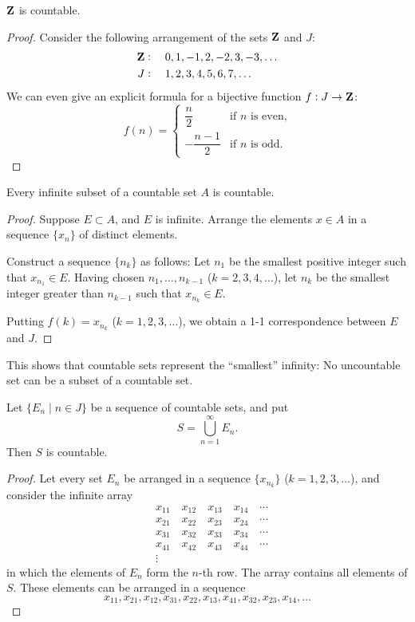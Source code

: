 \begin{proposition}
$\mathbf Z$ is countable.
\end{proposition}

\begin{proof}
Consider the following arrangement of the sets $\mathbf Z$ and $J$:
\begin{align*}
\mathbf Z&:\quad0,1,-1,2,-2,3,-3,\dots\\
J&:\quad1,2,3,4,5,6,7,\dots
\end{align*}
We can even give an explicit formula for a bijective function $f:J\to\mathbf Z$:
\[f(n)=\begin{cases}
\dfrac{n}{2}&\text{if }n\text{ is even,}\\[1ex]
-\dfrac{n-1}{2}&\text{if }n\text{ is odd.}
\end{cases}\]
\end{proof}

\begin{proposition}
Every infinite subset of a countable set $A$ is countable.
\end{proposition}

\begin{proof}
Suppose $E\subset A$, and $E$ is infinite. Arrange the elements $x\in A$ in a sequence $\{x_n\}$ of distinct elements.

Construct a sequence $\{n_k\}$ as follows: Let $n_1$ be the smallest positive integer such that $x_{n_1}\in E$. Having chosen $n_1,\dots,n_{k-1}$ ($k=2,3,4,\dots$), let $n_k$ be the smallest integer greater than $n_{k-1}$ such that $x_{n_k}\in E$.

Putting $f(k)=x_{n_k}$ ($k=1,2,3,\dots$), we obtain a 1-1 correspondence between $E$ and $J$.
\end{proof}

This shows that countable sets represent the ``smallest'' infinity: No uncountable set can be a subset of a countable set.

\begin{proposition}
Let $\{E_n\mid n\in J\}$ be a sequence of countable sets, and put
\[S=\bigcup_{n=1}^\infty E_n.\]
Then $S$ is countable.
\end{proposition}

\begin{proof}
Let every set $E_n$ be arranged in a sequence $\{x_{n_k}\}$ ($k=1,2,3,\dots$), and consider the infinite array
\begin{align*}
&x_{11}\quad x_{12}\quad x_{13}\quad x_{14}\quad\cdots\\
&x_{21}\quad x_{22}\quad x_{23}\quad x_{24}\quad\cdots\\
&x_{31}\quad x_{32}\quad x_{33}\quad x_{34}\quad\cdots\\
&x_{41}\quad x_{42}\quad x_{43}\quad x_{44}\quad\cdots\\
&\vdots
\end{align*}
in which the elements of $E_n$ form the $n$-th row. The array contains all elements of $S$. These elements can be arranged in a sequence
\[x_{11},x_{21},x_{12},x_{31},x_{22},x_{13},x_{41},x_{32},x_{23},x_{14},\dots\]

\end{proof}

